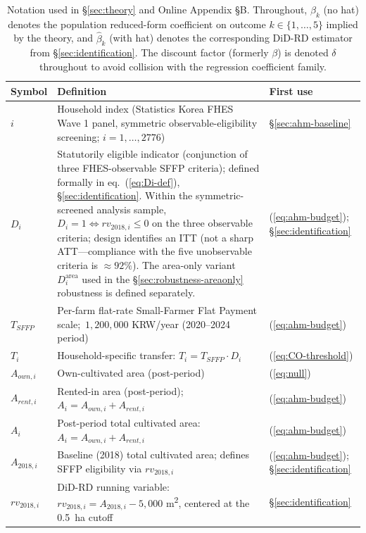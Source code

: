 \documentclass[12pt, a4paper]{article}
\begin{document}
\begin{table}[ht]
\centering
\caption{Notation used in \S\ref{sec:theory} and Online Appendix \S B. Throughout, $\beta_k$ (no hat) denotes the population reduced-form coefficient on outcome $k \in \{1,\ldots,5\}$ implied by the theory, and $\hat\beta_k$ (with hat) denotes the corresponding DiD-RD estimator from \S\ref{sec:identification}. The discount factor (formerly $\beta$) is denoted $\delta$ throughout to avoid collision with the regression coefficient family.}
\label{tab:notation}
\small
\begin{tabular}{p{2.3cm} p{8.8cm} p{2.6cm}}
\toprule
Symbol & Definition & First use \\
\midrule
$i$ & Household index (Statistics Korea FHES Wave 1 panel, symmetric observable-eligibility screening; $i = 1,\ldots,2776$) & \S\ref{sec:ahm-baseline} \\
$D_i$ & Statutorily eligible indicator (conjunction of three FHES-observable SFFP criteria); defined formally in eq.~(\ref{eq:Di-def}), \S\ref{sec:identification}. Within the symmetric-screened analysis sample, $D_i = 1 \iff rv_{2018,i} \le 0$ on the three observable criteria; design identifies an ITT (not a sharp ATT---compliance with the five unobservable criteria is $\approx 92\%$). The area-only variant $D^{\text{area}}_i$ used in the \S\ref{sec:robustness-areaonly} robustness is defined separately. & (\ref{eq:ahm-budget}); \S\ref{sec:identification} \\
$T_{SFFP}$ & Per-farm flat-rate Small-Farmer Flat Payment scale; ${\,}1{,}200{,}000$ KRW/year (2020--2024 period) & (\ref{eq:ahm-budget}) \\
$T_i$ & Household-specific transfer: $T_i = T_{SFFP} \cdot D_i$ & (\ref{eq:CO-threshold}) \\
$A_{own,i}$ & Own-cultivated area (post-period) & (\ref{eq:null}) \\
$A_{rent,i}$ & Rented-in area (post-period); $A_i = A_{own,i} + A_{rent,i}$ & (\ref{eq:ahm-budget}) \\
$A_i$ & Post-period total cultivated area: $A_i = A_{own,i} + A_{rent,i}$ & (\ref{eq:ahm-budget}) \\
$A_{2018,i}$ & Baseline (2018) total cultivated area; defines SFFP eligibility via $rv_{2018,i}$ & (\ref{eq:ahm-budget}); \S\ref{sec:identification} \\
$rv_{2018,i}$ & DiD-RD running variable: $rv_{2018,i} = A_{2018,i} - 5{,}000$ m\textsuperscript{2}, centered at the 0.5~ha cutoff & \S\ref{sec:identification} \\

\end{tabular}
\end{table}
\end{document}

